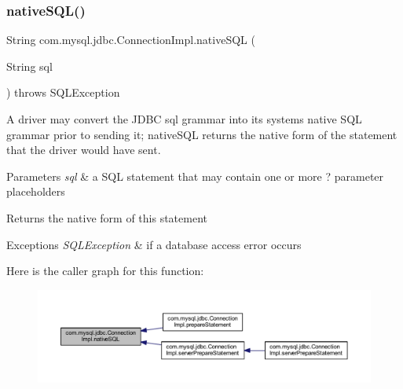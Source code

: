 \mbox{\label{classcom_1_1mysql_1_1jdbc_1_1_connection_impl_aa0f6347854ada6c4c6334d3cb0414a8d}} 
\subsubsection{\texorpdfstring{native\+S\+Q\+L()}{nativeSQL()}}
{\footnotesize\ttfamily String com.\+mysql.\+jdbc.\+Connection\+Impl.\+native\+S\+QL (\begin{DoxyParamCaption}\item[{String}]{sql }\end{DoxyParamCaption}) throws S\+Q\+L\+Exception}

A driver may convert the J\+D\+BC sql grammar into its system\textquotesingle{}s native S\+QL grammar prior to sending it; native\+S\+QL returns the native form of the statement that the driver would have sent.


\begin{DoxyParams}{Parameters}
{\em sql} & a S\+QL statement that may contain one or more \textquotesingle{}?\textquotesingle{} parameter placeholders \\
\hline
\end{DoxyParams}
\begin{DoxyReturn}{Returns}
the native form of this statement 
\end{DoxyReturn}

\begin{DoxyExceptions}{Exceptions}
{\em S\+Q\+L\+Exception} & if a database access error occurs \\
\hline
\end{DoxyExceptions}
Here is the caller graph for this function\+:\nopagebreak
\begin{figure}[H]
\begin{center}
\leavevmode
\includegraphics[width=350pt]{classcom_1_1mysql_1_1jdbc_1_1_connection_impl_aa0f6347854ada6c4c6334d3cb0414a8d_icgraph}
\end{center}
\end{figure}
\mbox{\label{classcom_1_1mysql_1_1jdbc_1_1_connection_impl_a7aebd878f6c8a52c2d2ea690734e681f}} 

